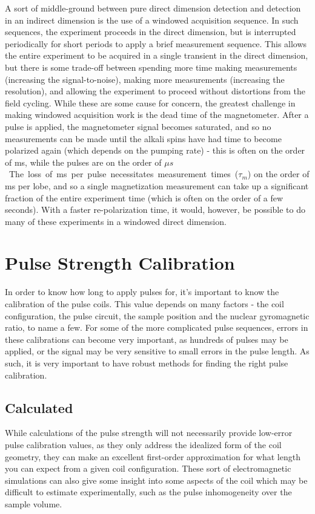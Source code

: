 \documentclass[PaulGanssle-Thesis.tex]{subfiles}
\begin{document}
A sort of middle-ground between pure direct dimension detection and detection in an indirect dimension is the use of a windowed acquisition sequence. In such sequences, the experiment proceeds in the direct dimension, but is interrupted periodically for short periods to apply a brief measurement sequence. This allows the entire experiment to be acquired in a single transient in the direct dimension, but there is some trade-off between spending more time making measurements (increasing the signal-to-noise), making more measurements (increasing the resolution), and allowing the experiment to proceed without distortions from the field cycling. While these are some cause for concern, the greatest challenge in making windowed acquisition work is the dead time of the magnetometer. After a pulse is applied, the magnetometer signal becomes saturated, and so no measurements can be made until the alkali spins have had time to become polarized again (which depends on the pumping rate) - this is often on the order of \unit[10-30]{ms}, while the pulses are on the order of \unit[100]{$\mu s$}. The loss of \unit[10-30]{ms} per pulse necessitates measurement times ($\tau_m$) on the order of \unit[50]{ms} per lobe, and so a single magnetization measurement can take up a significant fraction of the entire experiment time (which is often on the order of a few seconds). With a faster re-polarization time, it would, however, be possible to do many of these experiments in a windowed direct dimension.

\section{Pulse Strength Calibration}
\label{nmr.pulsecal}
In order to know how long to apply pulses for, it's important to know the calibration of the pulse coils. This value depends on many factors - the coil configuration, the pulse circuit, the sample position and the nuclear gyromagnetic ratio, to name a few. For some of the more complicated pulse sequences, errors in these calibrations can become very important, as hundreds of pulses may be applied, or the signal may be very sensitive to small errors in the pulse length. As such, it is very important to have robust methods for finding the right pulse calibration.

\subsection{Calculated}
\label{nmr.pulsecal.calculation}
While calculations of the pulse strength will not necessarily provide low-error pulse calibration values, as they only address the idealized form of the coil geometry, they can make an excellent first-order approximation for what length you can expect from a given coil configuration. These sort of electromagnetic simulations can also give some insight into some aspects of the coil which may be difficult to estimate experimentally, such as the pulse inhomogeneity over the sample volume. 
\end{document}
